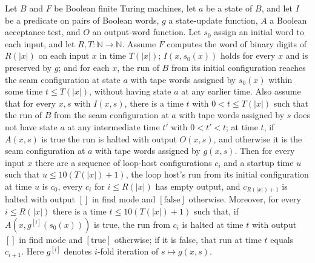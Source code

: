 \begin{theorem}
\label{Turing.FinTM.loopHostTM_contracts}
\leanok
{}
Let $B$ and $F$ be Boolean finite Turing machines, let $a$ be a state of $B$, and let
$I$ be a predicate on pairs of Boolean words, $g$ a state-update function, $A$ a Boolean
acceptance test, and $O$ an output-word function. Let $s_0$ assign an initial word to
each input, and let $R,T:\mathbb{N}\to\mathbb{N}$. Assume $F$ computes the word of
binary digits of $R(|x|)$ on each input $x$ in time $T(|x|)$; $I(x,s_0(x))$ holds for
every $x$ and is preserved by $g$; and for each $x$, the run of $B$ from its initial
configuration reaches the seam configuration at state $a$ with tape words assigned by
$s_0(x)$ within some time $t\le T(|x|)$, without having state $a$ at any earlier time.
Also assume that for every $x,s$ with $I(x,s)$, there is a time $t$ with $0<t\le T(|x|)$
such that the run of $B$ from the seam configuration at $a$ with tape words assigned by
$s$ does not have state $a$ at any intermediate time $t'$ with $0<t'<t$; at time $t$, if
$A(x,s)$ is true the run is halted with output $O(x,s)$, and otherwise it is the seam
configuration at $a$ with tape words assigned by $g(x,s)$. Then for every input $x$
there are a sequence of loop-host configurations $c_i$ and a startup time $u$ such that
$u\le 10(T(|x|)+1)$, the loop host's run from its initial configuration at time $u$ is
$c_0$, every $c_i$ for $i\le R(|x|)$ has empty output, and $c_{R(|x|)+1}$ is halted with
output $[]$ in find mode and $[\mathrm{false}]$ otherwise. Moreover, for every $i\le
R(|x|)$ there is a time $t\le 10(T(|x|)+1)$ such that, if $A(x,g^{[i]}(s_0(x)))$ is
true, the run from $c_i$ is halted at time $t$ with output $[]$ in find mode and
$[\mathrm{true}]$ otherwise; if it is false, that run at time $t$ equals $c_{i+1}$. Here
$g^{[i]}$ denotes $i$-fold iteration of $s\mapsto g(x,s)$.
\end{theorem}


